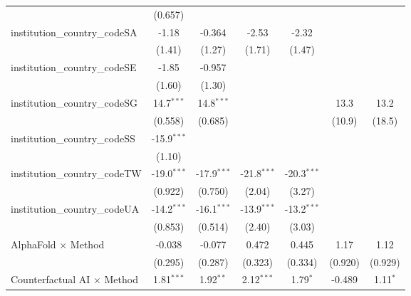 \begin{tabular}{lcccccc}
                                         & (0.657)       &               &               &               &               &   \\   
   institution\_country\_codeSA          & -1.18         & -0.364        & -2.53         & -2.32         &               &   \\   
                                         & (1.41)        & (1.27)        & (1.71)        & (1.47)        &               &   \\   
   institution\_country\_codeSE          & -1.85         & -0.957        &               &               &               &   \\   
                                         & (1.60)        & (1.30)        &               &               &               &   \\   
   institution\_country\_codeSG          & 14.7$^{***}$  & 14.8$^{***}$  &               &               & 13.3          & 13.2\\   
                                         & (0.558)       & (0.685)       &               &               & (10.9)        & (18.5)\\   
   institution\_country\_codeSS          & -15.9$^{***}$ &               &               &               &               &   \\   
                                         & (1.10)        &               &               &               &               &   \\   
   institution\_country\_codeTW          & -19.0$^{***}$ & -17.9$^{***}$ & -21.8$^{***}$ & -20.3$^{***}$ &               &   \\   
                                         & (0.922)       & (0.750)       & (2.04)        & (3.27)        &               &   \\   
   institution\_country\_codeUA          & -14.2$^{***}$ & -16.1$^{***}$ & -13.9$^{***}$ & -13.2$^{***}$ &               &   \\   
                                         & (0.853)       & (0.514)       & (2.40)        & (3.03)        &               &   \\   
   AlphaFold $\times$ Method             & -0.038        & -0.077        & 0.472         & 0.445         & 1.17          & 1.12\\   
                                         & (0.295)       & (0.287)       & (0.323)       & (0.334)       & (0.920)       & (0.929)\\   
   Counterfactual AI $\times$ Method     & 1.81$^{***}$  & 1.92$^{**}$   & 2.12$^{***}$  & 1.79$^{*}$    & -0.489        & 1.11$^{*}$\\   

\end{tabular}
